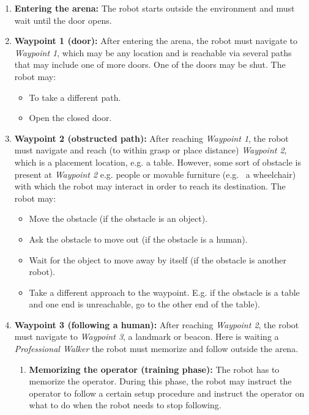 \begin{enumerate}
	\item \textbf{Entering the arena:} The robot starts outside the environment and must wait until the door opens.

	\item \textbf{Waypoint 1 (door):} After entering the arena, the robot must navigate to \textit{Waypoint 1}, 
	  which may be any location and is reachable via several paths that may include one of more doors.
	One of the doors may be shut. The robot may:
	\begin{itemize}
		\item To take a different path.
		\item Open the closed door.
	\end{itemize}

	\item \textbf{Waypoint 2 (obstructed path):} After reaching \textit{Waypoint 1}, the robot must navigate and reach (to within grasp or place distance) 
	  \textit{Waypoint 2}, which is a placement location, e.g. a table. 
	However, some sort of obstacle is present at \textit{Waypoint 2} e.g. people or movable furniture (e.g.~ a wheelchair) with which the robot may interact in order to reach its destination. 
	The robot may:
	\begin{itemize}
		\item Move the obstacle (if the obstacle is an object).
		\item Ask the obstacle to move out (if the obstacle is a human).
		\item Wait for the object to move away by itself (if the obstacle is another robot).
		\item Take a different approach to the waypoint. E.g. if the obstacle is a table and one end is unreachable, go to the other end of the table). 
	\end{itemize}

	\item \textbf{Waypoint 3 (following a human):} After reaching \textit{Waypoint 2}, the robot must navigate to \textit{Waypoint 3}, a landmark or beacon. 
	Here is waiting a \textit{Professional Walker} the robot must memorize and follow outside the arena.

	\begin{enumerate}
	\item \textbf{Memorizing the operator (training phase):} The robot has to memorize the operator.
	During this phase, the robot may instruct the operator to follow a certain setup procedure and instruct the operator on what to do when the robot needs to stop following.
	

\end{enumerate}
\end{enumerate}
